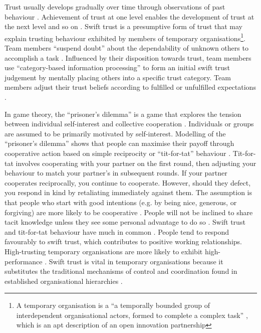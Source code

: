 Trust usually develops gradually over time through observations of past behaviour \citep{mayer1995integrative}. Achievement of trust at one level enables the development of trust at the next level and so on \citep{robert2009individual}. Swift trust is a presumptive form of trust that may explain trusting behaviour exhibited by members of temporary organisations\footnote{A temporary organisation is a \enquote{a temporally bounded group of interdependent organisational actors, formed to complete a complex task} \citep{burke2016temporary}, which is an apt description of an open innovation partnership}. Team members \enquote{suspend doubt} about the dependability of unknown others to accomplish a task \citep{germain2014role}. Influenced by their disposition towards trust, team members use \enquote{category-based information processing} to form an initial swift trust judgement by mentally placing others into a specific trust category. Team members adjust their trust beliefs according to fulfilled or unfulfilled expectations \citep{meyerson1996swift,robert2009individual}. \medskip

In game theory, the \enquote{prisoner's dilemma} is a game that explores the tension between individual self-interest and collective cooperation \citep{richards2001reciprocity}. Individuals or groups are assumed to be primarily motivated by self-interest. Modelling of the \enquote{prisoner's dilemma} shows that people can maximise their payoff through cooperative action based on simple reciprocity or \enquote{tit-for-tat} behaviour \citep{axelrod1980effective,axelrod1981evolution}. Tit-for-tat involves cooperating with your partner on the first round, then adjusting your behaviour to match your partner's in subsequent rounds. If your partner cooperates reciprocally, you continue to cooperate. However, should they defect, you respond in kind by retaliating immediately against them. The assumption is that people who start with good intentions (e.g. by being nice, generous, or forgiving) are more likely to be cooperative \citep{blais1987epistemic,richards2001reciprocity, segal2007tit, fulmer2013trust}. People will not be inclined to share tacit knowledge unless they see some personal advantage to do so \citep{yang2006knowledge, singh2019territoriality}. Swift trust and tit-for-tat behaviour have much in common \citep{fulmer2013trust}. People tend to respond favourably to swift trust, which contributes to positive working relationships. High-trusting temporary organisations are more likely to exhibit high-performance \citep{ashleigh2007trust}. Swift trust is vital in temporary organisations because it substitutes the traditional mechanisms of control and coordination found in established organisational hierarchies \citep{kasper2001communicating}. \medskip

